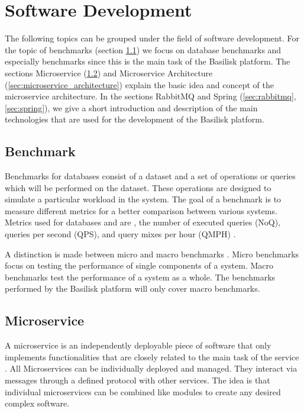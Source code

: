 \section{Software Development}
\label{sec:software_dev}
The following topics can be grouped under the field of software development.
For the topic of benchmarks (section \ref{sec:benchmark}) we focus on database benchmarks and especially \ts{} benchmarks since this is the main task of the Basilisk platform.
The sections Microservice (\ref{sec:microservice}) and Microservice Architecture (\ref{sec:microservice_architecture}) explain the basic idea and concept of the microservice architecture.
In the sections RabbitMQ and Spring (\ref{sec:rabbitmq}, \ref{sec:spring}), we give a short introduction and description of the main technologies that are used for the development of the Basilisk platform.

\subsection{Benchmark}
\label{sec:benchmark}
Benchmarks for databases consist of a dataset and a set of operations or queries which will be performed on the dataset.
These operations are designed to simulate a particular workload in the system.
The goal of a benchmark is to measure different metrics for a better comparison between various systems.
Metrics used for databases and \tsp{} are \eg, the number of executed queries (NoQ), queries per second (QPS), and query mixes per hour (QMPH) \cite{IguanaDocsMetrics}.

A distinction is made between micro and macro benchmarks \cite{gibbsMicrobenchmarksVsMacrobenchmarks}.
Micro benchmarks focus on testing the performance of single components of a system.
Macro benchmarks test the performance of a system as a whole.
The benchmarks performed by the Basilisk platform will only cover macro benchmarks.

\subsection{Microservice}
\label{sec:microservice}
A microservice is an independently deployable piece of software that only implements functionalities that are closely related to the main task of the service \cite{dragoniMicroservicesYesterdayToday2017}.
All Microservices can be individually deployed and managed.
They interact via messages through a defined protocol with other services.
The idea is that individual microservices can be combined like modules to create any desired complex software.

